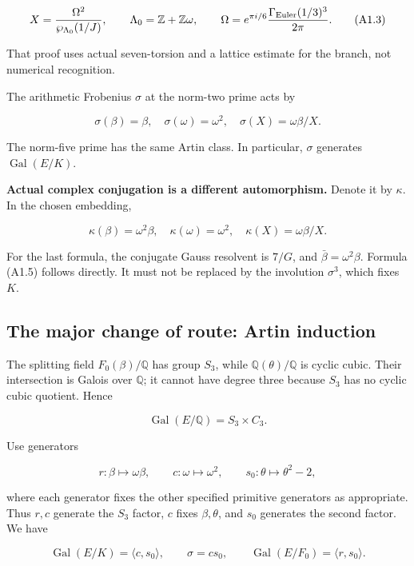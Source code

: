 \[
X=\frac{\Omega^2}{\wp_{\Lambda_0}(1/J)},\qquad
\Lambda_0=\mathbb Z+\mathbb Z\omega,\qquad
\Omega=e^{\pi i/6}\frac{\Gamma_{\rm Euler}(1/3)^3}{2\pi}. \tag{A1.3}
\]

That proof uses actual seven-torsion and a lattice estimate for the
branch, not numerical recognition.

The arithmetic Frobenius \(\sigma\) at the norm-two prime acts by

\[
\sigma(\beta)=\beta,\quad \sigma(\omega)=\omega^2,\quad
\sigma(X)=\omega\beta/X. \tag{A1.4}
\]

The norm-five prime has the same Artin class. In particular, \(\sigma\)
generates \(\operatorname{Gal}(E/K)\).

\textbf{Actual complex conjugation is a different automorphism.} Denote
it by \(\kappa\). In the chosen embedding,

\[
\kappa(\beta)=\omega^2\beta,\quad \kappa(\omega)=\omega^2,
\quad \kappa(X)=\omega\beta/X. \tag{A1.5}
\]

For the last formula, the conjugate Gauss resolvent is \(7/G\), and
\(\bar\beta=\omega^2\beta\). Formula (A1.5) follows directly. It must
not be replaced by the involution \(\sigma^3\), which fixes \(K\).

\hypertarget{A-the-major-change-of-route-artin-induction}{%
\subsection{The major change of route: Artin
induction}\label{A-the-major-change-of-route-artin-induction}}

The splitting field \(F_0(\beta)/\mathbb Q\) has group \(S_3\), while
\(\mathbb Q(\theta)/\mathbb Q\) is cyclic cubic. Their intersection is
Galois over \(\mathbb Q\); it cannot have degree three because \(S_3\)
has no cyclic cubic quotient. Hence

\[
\operatorname{Gal}(E/\mathbb Q)=S_3\times C_3. \tag{A2.1}
\]

Use generators

\[
r:\beta\mapsto\omega\beta,\qquad
c:\omega\mapsto\omega^2,\qquad
s_0:\theta\mapsto\theta^2-2,
\]

where each generator fixes the other specified primitive generators as
appropriate. Thus \(r,c\) generate the \(S_3\) factor, \(c\) fixes
\(\beta,\theta\), and \(s_0\) generates the second factor. We have

\[
\operatorname{Gal}(E/K)=\langle c,s_0\rangle,
\qquad \sigma=cs_0,
\qquad \operatorname{Gal}(E/F_0)=\langle r,s_0\rangle.
\]

